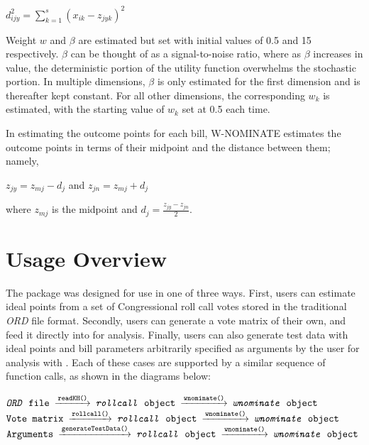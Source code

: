 \documentclass[12pt]{article}
\begin{document}
\begin{center}
{\Large
\begin{math}
d^{2}_{ijy}=\sum_{k=1}^{s}(x_{ik}-z_{jyk})^2
\end{math}
}
\end{center}

Weight $w$ and $\beta$ are estimated but set with initial values
of 0.5 and 15 respectively.  $\beta$ can be thought of as a
signal-to-noise ratio, where as $\beta$ increases in value, the
deterministic portion of the utility function overwhelms the
stochastic portion.  In multiple dimensions, $\beta$ is only
estimated for the first dimension and is thereafter kept constant.
For all other dimensions, the corresponding $w_{k}$ is estimated,
with the starting value of $w_{k}$ set at 0.5 each time.

In estimating the outcome points for each bill, W-NOMINATE estimates
the outcome points in terms of their midpoint and the distance between
them; namely,

\begin{center}
$z_{jy}=z_{mj}-d_{j}$ and $z_{jn}=z_{mj}+d_{j}$
\end{center}

where $z_{mj}$ is the midpoint and $d_{j}=\frac{z_{jy}-z_{jn}}{2}$.

\section{Usage Overview}

The \verb@wnominate@ package was designed for use in one of three
ways.  First, users can estimate ideal points from a set of
Congressional roll call votes stored in the traditional \emph{ORD}
file format.  Secondly, users can generate a vote matrix of their
own, and feed it directly into \verb@wnominate@ for analysis.
Finally, users can also generate test data with ideal points and
bill parameters arbitrarily specified as arguments by the user for
analysis with \verb@wnominate@. Each of these cases are supported
by a similar sequence of function calls, as shown in the diagrams
below:

\begin{flushleft}
$
\begin{CD}
\texttt{\emph{ORD} file}
   @>\texttt{readKH()}>>
   \texttt{\emph{rollcall} object}
   @>\texttt{wnominate()}>>
   \texttt{\emph{wnominate} object}
\end{CD}
$
$
\begin{CD}
   \texttt{Vote matrix}
   @>\texttt{rollcall()}>>
   \texttt{\emph{rollcall} object}
   @>\texttt{wnominate()}>>
   \texttt{\emph{wnominate} object}
\end{CD}
$
$
\begin{CD}
   \texttt{Arguments}
   @>\texttt{generateTestData()}>>
   \texttt{\emph{rollcall} object}
   @>\texttt{wnominate()}>>
   \texttt{\emph{wnominate} object}
\end{CD}
$
\end{flushleft}
\end{document}
